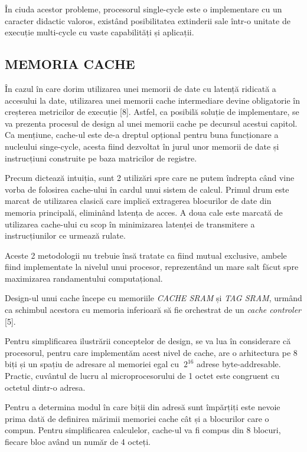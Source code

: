\documentclass[12pt]{article}
\begin{document}
 În ciuda acestor probleme, procesorul single-cycle este o implementare cu un caracter didactic valoros, existând posibilitatea extinderii sale într-o unitate de execuție multi-cycle cu vaste capabilități și aplicații.
 
\newpage
\subsection{MEMORIA CACHE}

În cazul în care dorim utilizarea unei memorii de date cu latență ridicată a accesului la date, utilizarea unei memorii cache intermediare devine obligatorie în creșterea metricilor de execuție [8]. Astfel, ca posibilă soluție de implementare, se va prezenta procesul de design al unei memorii cache pe decursul acestui capitol. Ca mențiune, cache-ul este de-a dreptul opțional pentru buna funcționare a nucleului singe-cycle, acesta fiind dezvoltat în jurul unor memorii de date și instrucțiuni construite pe baza matricilor de registre.
 
Precum dictează intuiția, sunt 2 utilizări spre care ne putem îndrepta când vine vorba de folosirea cache-ului în cardul unui sistem de calcul. Primul drum este marcat de utilizarea clasică care implică extragerea blocurilor de date din memoria principală, eliminând latența de acces. A doua cale este marcată de utilizarea cache-ului cu scop în minimizarea latenței de transmitere a instrucțiunilor ce urmează rulate.

Aceste 2 metodologii nu trebuie însă tratate ca fiind mutual exclusive, ambele fiind implementate la nivelul unui procesor, reprezentând un mare salt făcut spre maximizarea randamentului computațional.

Design-ul unui cache începe cu memoriile \textit{CACHE SRAM} și \textit{TAG SRAM}, urmând ca schimbul acestora cu memoria inferioară să fie orchestrat de un \textit{cache controler} [5].

Pentru simplificarea ilustrării conceptelor de design, se va lua în considerare că procesorul, pentru care implementăm acest nivel de cache, are o arhitectura pe 8 biți și un spațiu de adresare al memoriei egal cu $\ 2^{16}$ adrese byte-addresable. Practic, cuvântul de lucru al microprocesorului de 1 octet este congruent cu octetul dintr-o adresa.

Pentru a determina modul în care biții din adresă sunt împărțiți este nevoie prima dată de definirea mărimii memoriei cache cât și a blocurilor care o compun. Pentru simplificarea calculelor, cache-ul va fi compus din 8 blocuri, fiecare bloc având un număr de 4 octeți. 
\end{document}
